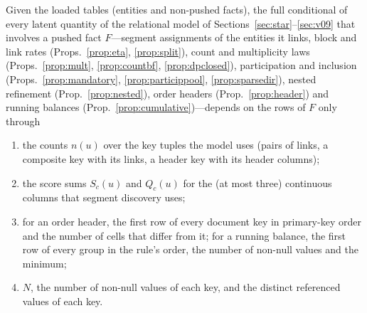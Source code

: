 \begin{proposition}\label{prop:pdsuff}
Given the loaded tables (entities and non-pushed facts), the full conditional of every latent quantity of the relational model of Sections~\ref{sec:star}--\ref{sec:v09} that involves a pushed fact $F$---segment assignments of the entities it links, block and link rates (Props.~\ref{prop:eta}, \ref{prop:split}), count and multiplicity laws (Props.~\ref{prop:mult}, \ref{prop:countbf}, \ref{prop:dpclosed}), participation and inclusion (Props.~\ref{prop:mandatory}, \ref{prop:particippool}, \ref{prop:sparsedir}), nested refinement (Prop.~\ref{prop:nested}), order headers (Prop.~\ref{prop:header}) and running balances (Prop.~\ref{prop:cumulative})---depends on the rows of $F$ only through
\begin{enumerate}
\item the counts $n(u)$ over the key tuples the model uses (pairs of links, a composite key with its links, a header key with its header columns);
\item the score sums $S_c(u)$ and $Q_c(u)$ for the (at most three) continuous columns that segment discovery uses;
\item for an order header, the first row of every document key in primary-key order and the number of cells that differ from it; for a running balance, the first row of every group in the rule's order, the number of non-null values and the minimum;
\item $N$, the number of non-null values of each key, and the distinct referenced values of each key.
\end{enumerate}
\end{proposition}

